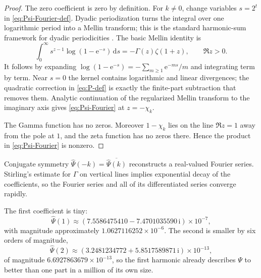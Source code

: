 \documentclass[11pt,oneside]{article}
\theoremstyle{definition}
\theoremstyle{remark}
\newcommand{\e}{\mathrm e}
\newcommand{\ii}{\mathrm i}
\newcommand{\dd}{\,\mathrm d}
\begin{document}
\begin{proof}
The zero coefficient is zero by definition.  For $k\ne0$, change variables $s=2^t$ in
\eqref{eq:Psi-Fourier-def}.  Dyadic periodization turns the integral over one logarithmic
period into a Mellin transform; this is the standard harmonic-sum framework for dyadic
periodicities \cite{flajolet1995}.  The basic Mellin identity is
\begin{equation}
 \int_0^\infty s^{z-1}\log(1-\e^{-s})\dd s
 =-\Gamma(z)\zeta(1+z),\qquad \Re z>0.                    \label{eq:Mellin-Bose}
\end{equation}
It follows by expanding $\log(1-\e^{-s})=-\sum_{m\ge1}\e^{-ms}/m$ and integrating term by
term.  Near $s=0$ the kernel contains logarithmic and linear divergences; the quadratic
correction in \eqref{eq:P-def} is exactly the finite-part subtraction that removes them.
Analytic continuation of the regularized Mellin transform to the imaginary axis gives
\eqref{eq:Psi-Fourier} at $z=-\chi_k$.

The Gamma function has no zeros.  Moreover $1-\chi_k$ lies on the line $\Re z=1$ away from
the pole at $1$, and the zeta function has no zeros there.  Hence the product in
\eqref{eq:Psi-Fourier} is nonzero.
\end{proof}

Conjugate symmetry $\widehat\Psi(-k)=\overline{\widehat\Psi(k)}$ reconstructs a real-valued
Fourier series.  Stirling's estimate for $\Gamma$ on vertical lines implies exponential
decay of the coefficients, so the Fourier series and all of its differentiated series
converge rapidly.

The first coefficient is tiny:
\begin{equation}
 \widehat\Psi(1)
 \approx(7.5586475410-7.4701035590\,\ii)\times10^{-7},     \label{eq:Psi-first-coeff}
\end{equation}
with magnitude approximately $1.0627116252\times10^{-6}$.  The second is smaller by six
orders of magnitude,
\begin{equation}
 \widehat\Psi(2)
 \approx(3.2481234772+5.8517589871\,\ii)\times10^{-13},    \label{eq:Psi-second-coeff}
\end{equation}
of magnitude $6.6927863679\times10^{-13}$, so the first harmonic already describes $\Psi$ to
better than one part in a million of its own size.
\end{document}
